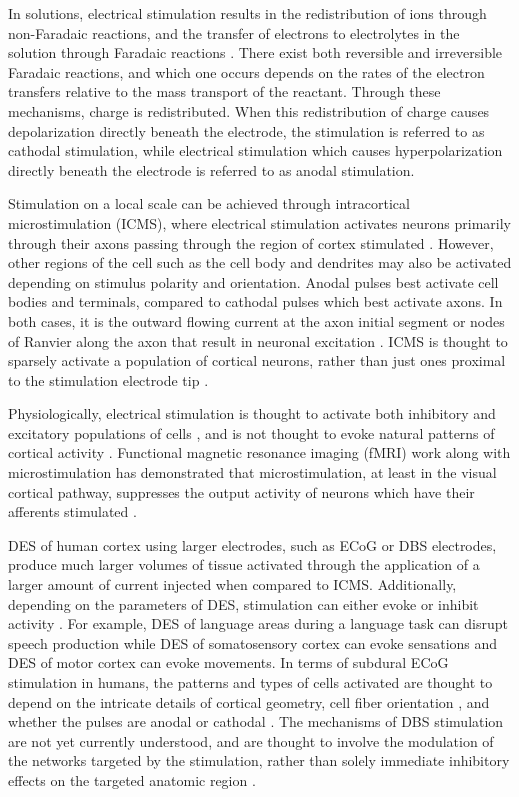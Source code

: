 In solutions, electrical stimulation results in the redistribution of ions through non-Faradaic reactions, and the transfer of electrons to electrolytes in the solution through Faradaic reactions \cite{Merrill2005}. There exist both reversible and irreversible Faradaic reactions, and which one occurs depends on the rates of the electron transfers relative to the mass transport of the reactant. Through these mechanisms, charge is redistributed. When this redistribution of charge causes depolarization directly beneath the electrode, the stimulation is referred to as cathodal stimulation, while electrical stimulation which causes hyperpolarization directly beneath the electrode is referred to as anodal stimulation. 

Stimulation on a local scale can be achieved through intracortical microstimulation (ICMS), where electrical stimulation activates neurons primarily through their axons passing through the region of cortex stimulated \cite{Tehovnik2006a,Nowak1998}. However, other regions of the cell such as the cell body and dendrites may also be activated depending on stimulus polarity and orientation. Anodal pulses best activate cell bodies and terminals, compared to cathodal pulses which best activate axons. In both cases, it is the outward flowing current at the axon initial segment or nodes of Ranvier along the axon that result in neuronal excitation \cite{Tehovnik2006a,McIntyre2000}. ICMS is thought to sparsely activate a population of cortical neurons, rather than just ones proximal to the stimulation electrode tip \cite{Histed2009}. 

Physiologically, electrical stimulation is thought to activate both inhibitory and excitatory populations of cells \cite{Butovas2003a}, and is not thought to evoke natural patterns of cortical activity \cite{Millard2015a}. Functional magnetic resonance imaging (fMRI) work along with microstimulation has demonstrated that microstimulation, at least in the visual cortical pathway, suppresses the output activity of neurons which have their afferents stimulated \cite{Logothetis2010}. 

DES of human cortex using larger electrodes, such as ECoG or DBS electrodes, produce much larger volumes of tissue activated through the application of a larger amount of current injected  \cite{Vincent2016} when compared to ICMS. Additionally, depending on the parameters of DES, stimulation can either evoke or inhibit activity \cite{Borchers2012}. For example, DES of language areas during a language task can disrupt speech production while DES of somatosensory cortex can evoke sensations and DES of motor cortex can evoke movements. In terms of subdural ECoG stimulation in humans, the patterns and types of cells activated are thought to depend on the intricate details of cortical geometry, cell fiber orientation \cite{Kudela2015}, and whether the pulses are anodal or cathodal \cite{Seo2015}. The mechanisms of DBS stimulation are not yet currently understood, and are thought to involve the modulation of the networks targeted by the stimulation, rather than solely immediate inhibitory effects on the targeted anatomic region \cite{Ashkan2017,Montgomery2008}.

